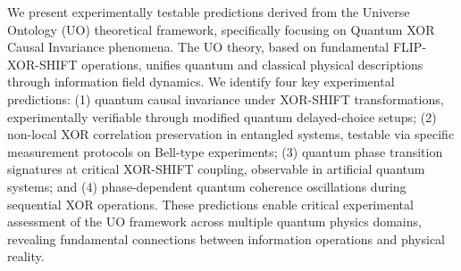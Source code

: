 We present experimentally testable predictions derived from the Universe Ontology (UO) theoretical framework, specifically focusing on Quantum XOR Causal Invariance phenomena. The UO theory, based on fundamental FLIP-XOR-SHIFT operations, unifies quantum and classical physical descriptions through information field dynamics. We identify four key experimental predictions: (1) quantum causal invariance under XOR-SHIFT transformations, experimentally verifiable through modified quantum delayed-choice setups; (2) non-local XOR correlation preservation in entangled systems, testable via specific measurement protocols on Bell-type experiments; (3) quantum phase transition signatures at critical XOR-SHIFT coupling, observable in artificial quantum systems; and (4) phase-dependent quantum coherence oscillations during sequential XOR operations. These predictions enable critical experimental assessment of the UO framework across multiple quantum physics domains, revealing fundamental connections between information operations and physical reality.